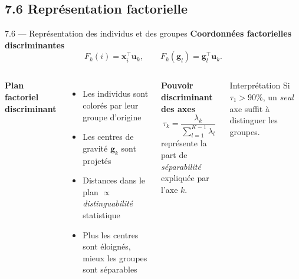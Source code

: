 \subsection{7.6 Représentation factorielle}
\begin{frame}{7.6 — Représentation des individus et des groupes}
\textbf{Coordonnées factorielles discriminantes}
\[
F_k(i) = \mathbf{x}_i^\top \mathbf{u}_k, \qquad
F_k(\mathbf{g}_l) = \mathbf{g}_l^\top \mathbf{u}_k.
\]

\begin{columns}[T]
\textbf{Plan factoriel discriminant}
\begin{itemize}\small
  \item Les individus sont colorés par leur groupe d'origine
  \item Les centres de gravité $\mathbf{g}_k$ sont projetés
  \item Distances dans le plan $\propto$ \emph{distinguabilité}
        statistique
  \item Plus les centres sont éloignés, mieux les groupes
        sont \alert{séparables}
\end{itemize}
\textbf{Pouvoir discriminant des axes}
\[
\tau_k = \frac{\lambda_k}{\sum_{l=1}^{K-1} \lambda_l}
\]
représente la part de \emph{séparabilité} expliquée par l'axe $k$.

\vspace{0.2cm}
\begin{block}{Interprétation}
\small Si $\tau_1 > 90\%$, un \emph{seul} axe suffit à distinguer les groupes.
\end{block}
\end{columns}
\end{frame}

